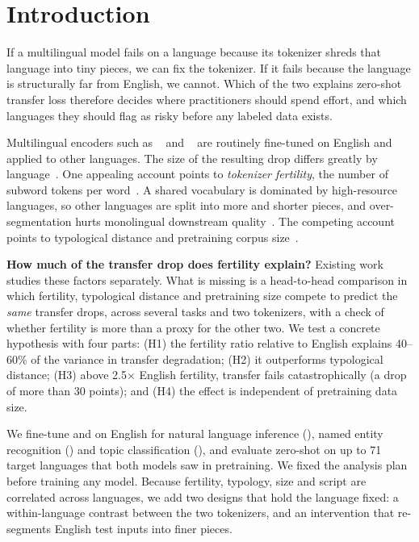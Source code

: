 \section{Introduction}
\label{sec:intro}

If a multilingual model fails on a language because its tokenizer shreds that language into tiny pieces, we can fix the tokenizer.
If it fails because the language is structurally far from English, we cannot.
Which of the two explains zero-shot transfer loss therefore decides where practitioners should spend effort, and which languages they should flag as risky before any labeled data exists.

Multilingual encoders such as \mbert~\cite{devlin2019bert} and \xlmr~\cite{conneau2020xlmr} are routinely fine-tuned on English and applied to other languages.
The size of the resulting drop differs greatly by language~\cite{pires2019multilingual,wu2020all,hu2020xtreme}.
One appealing account points to \emph{tokenizer fertility}, the number of subword tokens per word~\cite{acs2019exploring}.
A shared vocabulary is dominated by high-resource languages, so other languages are split into more and shorter pieces, and over-segmentation hurts monolingual downstream quality~\cite{rust2021good}.
The competing account points to typological distance and pretraining corpus size~\cite{pires2019multilingual,lauscher2020zero}.

{\bf How much of the transfer drop does fertility explain?}
Existing work studies these factors separately.
What is missing is a head-to-head comparison in which fertility, typological distance and pretraining size compete to predict the \emph{same} transfer drops, across several tasks and two tokenizers, with a check of whether fertility is more than a proxy for the other two.
We test a concrete hypothesis with four parts:
(H1) the fertility ratio relative to English explains 40--60\% of the variance in transfer degradation;
(H2) it outperforms typological distance;
(H3) above 2.5$\times$ English fertility, transfer fails catastrophically (a drop of more than 30 points); and
(H4) the effect is independent of pretraining data size.

We fine-tune \mbert and \xlmr on English for natural language inference (\xnli), named entity recognition (\wikiann) and topic classification (\sib), and evaluate zero-shot on up to 71 target languages that both models saw in pretraining.
We fixed the analysis plan before training any model.
Because fertility, typology, size and script are correlated across languages, we add two designs that hold the language fixed: a within-language contrast between the two tokenizers, and an intervention that re-segments English test inputs into finer pieces.

